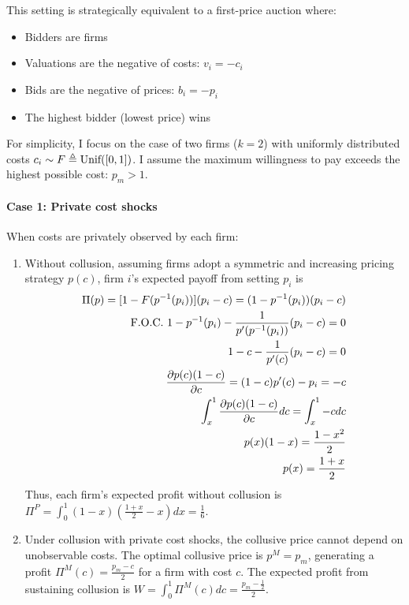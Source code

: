\documentclass[12pt]{article}
\begin{document}
This setting is strategically equivalent to a first-price auction where:
\begin{itemize}
    \item Bidders are firms
    \item Valuations are the negative of costs: $v_i = -c_i$
    \item Bids are the negative of prices: $b_i = -p_i$
    \item The highest bidder (lowest price) wins
\end{itemize}

For simplicity, I focus on the case of two firms ($k=2$) with uniformly distributed costs $c_i\sim F\triangleq\textnormal{Unif}([0,1])$. I assume the maximum willingness to pay exceeds the highest possible cost: $p_m>1$.

\paragraph{Case 1: Private cost shocks}
When costs are privately observed by each firm:
\begin{enumerate}
    \item Without collusion, assuming firms adopt a symmetric and increasing pricing strategy $p(c)$, firm $i$'s expected payoff from setting $p_i$ is
    \begin{equation}
        \begin{aligned}
            \Pi(p)=[1-F(p^{-1}(p_i))](p_i-c)=(1-p^{-1}(p_i))(p_i-c)\\
            \textnormal{F.O.C. }1-p^{-1}(p_i)-\frac{1}{p'(p^{-1}(p_i))}(p_i-c)=0\\
            1-c-\frac{1}{p'(c)}(p_i-c)=0\\
            \frac{\partial p(c)(1-c)}{\partial c}=(1-c)p'(c)-p_i=-c\\
            \int_{x}^{1}\frac{\partial p(c)(1-c)}{\partial c}dc=\int_{x}^{1}-cdc\\
            p(x)(1-x)=\frac{1-x^2}{2}\\
            p(x)=\frac{1+x}{2}
        \end{aligned}
        \nonumber
    \end{equation}
    Thus, each firm's expected profit without collusion is $\Pi^P=\int_0^1 (1-x)(\frac{1+x}{2}-x)dx=\frac{1}{6}$.
    \item Under collusion with private cost shocks, the collusive price cannot depend on unobservable costs. The optimal collusive price is $p^M=p_m$, generating a profit $\Pi^M(c)=\frac{p_m-c}{2}$ for a firm with cost $c$. The expected profit from sustaining collusion is $W=\int_0^1 \Pi^M(c)dc=\frac{p_m-\frac{1}{2}}{2}$.
\end{enumerate}
\end{document}
